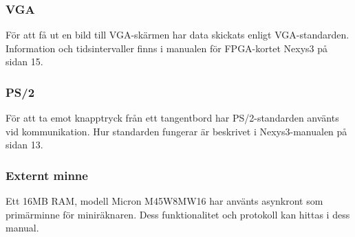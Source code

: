\documentclass[main.tex]{subfiles}
\begin{document}
\subsubsection*{VGA}
För att få ut en bild till VGA-skärmen har data skickats enligt
VGA-standarden. Information och tidsintervaller finns i manualen för
FPGA-kortet Nexys3 på sidan 15.\cite{nexys3}
\subsubsection*{PS/2}
För att ta emot knapptryck från ett tangentbord har PS/2-standarden använts vid
kommunikation. Hur standarden fungerar är beskrivet i Nexys3-manualen på sidan
13.\cite{nexys3}
\subsubsection*{Externt minne}
Ett 16MB RAM, modell Micron M45W8MW16 har använts asynkront som primärminne för
miniräknaren. Dess funktionalitet och protokoll kan hittas i dess
manual.\cite{m45}

\clearpage
\end{document}
